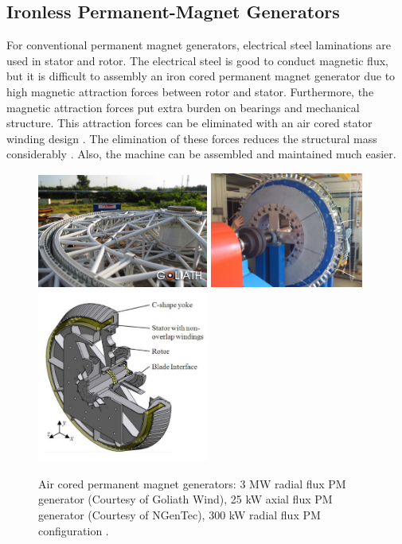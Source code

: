 \documentclass[a4paper, 11pt]{article} %
\begin{document}
\subsection{Ironless Permanent-Magnet Generators}

For conventional permanent magnet generators, electrical steel laminations are used in stator and rotor. The electrical steel is good to conduct magnetic flux, but it is difficult to assembly an iron cored permanent magnet generator due to high magnetic attraction forces between rotor and stator. Furthermore, the magnetic attraction forces put extra burden on bearings and mechanical structure. This attraction forces can be eliminated with an air cored stator winding design \cite{Mueller2009}. The elimination of these forces reduces the structural mass considerably \cite{McDonald2008b}. Also, the machine can be assembled and maintained much easier. 


  \begin{figure}[t]
    \centering
    \includegraphics[width=0.5\textwidth]{goliath}
    \includegraphics[width=0.45\textwidth]{25kw_cgen}
    \includegraphics[width=0.5\textwidth]{c-core_kamper}
    \caption{Air cored permanent magnet generators: 3 MW radial flux PM generator (Courtesy of Goliath Wind), 25 kW axial flux PM generator (Courtesy of NGenTec), 300 kW radial flux PM configuration \cite{Wijk2010}.} 
    \label{air_cored}
  \end{figure}
\end{document}
